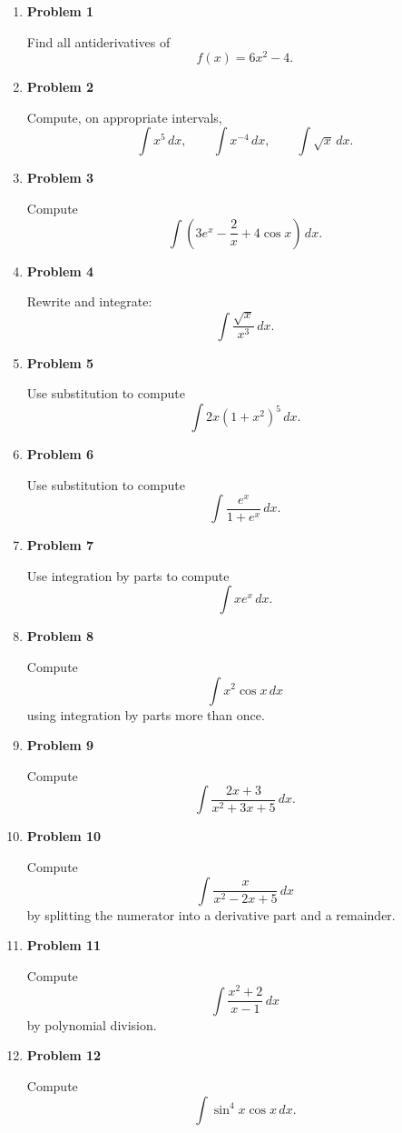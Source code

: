 \begin{enumerate}
\item \textbf{Problem 1}\par
Find all antiderivatives of
\[
f(x)=6x^2-4.
\]

\item \textbf{Problem 2}\par
Compute, on appropriate intervals,
\[
\int x^5\,dx,
\qquad
\int x^{-4}\,dx,
\qquad
\int \sqrt{x}\,dx.
\]

\item \textbf{Problem 3}\par
Compute
\[
\int \left(3e^x-\frac{2}{x}+4\cos x\right)\,dx.
\]

\item \textbf{Problem 4}\par
Rewrite and integrate:
\[
\int \frac{\sqrt{x}}{x^3}\,dx.
\]

\item \textbf{Problem 5}\par
Use substitution to compute
\[
\int 2x(1+x^2)^5\,dx.
\]

\item \textbf{Problem 6}\par
Use substitution to compute
\[
\int \frac{e^x}{1+e^x}\,dx.
\]

\item \textbf{Problem 7}\par
Use integration by parts to compute
\[
\int xe^x\,dx.
\]

\item \textbf{Problem 8}\par
Compute
\[
\int x^2\cos x\,dx
\]
using integration by parts more than once.

\item \textbf{Problem 9}\par
Compute
\[
\int \frac{2x+3}{x^2+3x+5}\,dx.
\]

\item \textbf{Problem 10}\par
Compute
\[
\int \frac{x}{x^2-2x+5}\,dx
\]
by splitting the numerator into a derivative part and a remainder.

\item \textbf{Problem 11}\par
Compute
\[
\int \frac{x^2+2}{x-1}\,dx
\]
by polynomial division.

\item \textbf{Problem 12}\par
Compute
\[
\int \sin^4 x\cos x\,dx.
\]


\end{enumerate}
